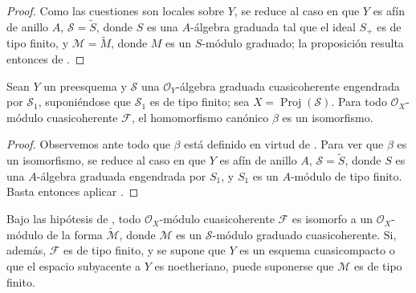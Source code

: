 \documentclass[oneside,10pt]{amsart}
\let\EGAOriginalLabel\label
\renewcommand{\label}[1]{\phantomsection\EGAOriginalLabel{#1}}
\begin{document}
\begin{proof}
Como las cuestiones son locales sobre $Y$, se reduce al caso en que $Y$ es afín de anillo $A$, $\mathcal{S}=\widetilde{S}$, donde $S$ es una $A$-álgebra graduada tal que el ideal $S_+$ es de tipo finito, y $\mathcal{M}=\widetilde{M}$, donde $M$ es un $S$-módulo graduado; la proposición resulta entonces de .
\end{proof}

\begin{theorem}[3.4.4]
\label{II.3.4.4-fr}
Sean $Y$ un preesquema y $\mathcal{S}$ una $\mathcal{O}_Y$-álgebra graduada cuasicoherente engendrada por $\mathcal{S}_1$, suponiéndose que $\mathcal{S}_1$ es de tipo finito; sea $X=\operatorname{Proj}(\mathcal{S})$.
Para todo $\mathcal{O}_X$-módulo cuasicoherente $\mathcal{F}$, el homomorfismo canónico $\beta$  es un isomorfismo.
\end{theorem}

\begin{proof}
Observemos ante todo que $\beta$ está definido en virtud de .
Para ver que $\beta$ es un isomorfismo, se reduce al caso en que $Y$ es afín de anillo $A$, $\mathcal{S}=\widetilde{S}$, donde $S$ es una $A$-álgebra graduada engendrada por $S_1$, y $S_1$ es un $A$-módulo de tipo finito.
Basta entonces aplicar .
\end{proof}

\begin{corollary}[3.4.5]
\label{II.3.4.5-fr}
Bajo las hipótesis de , todo $\mathcal{O}_X$-módulo cuasicoherente $\mathcal{F}$ es isomorfo a un $\mathcal{O}_X$-módulo de la forma $\widetilde{\mathcal{M}}$, donde $\mathcal{M}$ es un $\mathcal{S}$-módulo graduado cuasicoherente.
Si, además, $\mathcal{F}$ es de tipo finito, y se supone que $Y$ es un esquema cuasicompacto o que el espacio subyacente a $Y$ es noetheriano, puede suponerse que $\mathcal{M}$ es de tipo finito.
\end{corollary}
\end{document}
